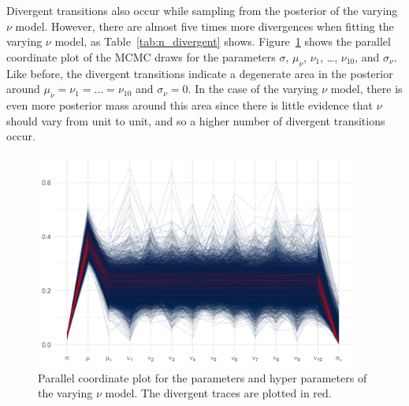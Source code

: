

Divergent transitions also occur while sampling from the posterior of the varying $\nu$ model. However, there are almost five times more divergences when fitting the varying $\nu$ model, as Table~\ref{tab:n_divergent} shows. Figure~\ref{fig:pp_nu_parcoord} shows the parallel coordinate plot of the MCMC draws for the parameters $\sigma$, $\mu_\nu$, $\nu_1$, \ldots, $\nu_{10}$, and $\sigma_\nu$. Like before, the divergent transitions indicate a degenerate area in the posterior around $\mu_\nu = \nu_1 = \ldots = \nu_{10}$ and $\sigma_\nu = 0$. In the case of the varying $\nu$ model, there is even more posterior mass around this area since there is little evidence that $\nu$ should vary from unit to unit, and so a higher number of divergent transitions occur.

\begin{figure}
   \centering
   \includegraphics[width=0.95\textwidth]{./figures/ch-5/plot-pp-nu-parcoord.png}
   \caption{Parallel coordinate plot for the parameters and hyper parameters of the varying $\nu$ model. The divergent traces are plotted in red.}
   \label{fig:pp_nu_parcoord} 
\end{figure}

